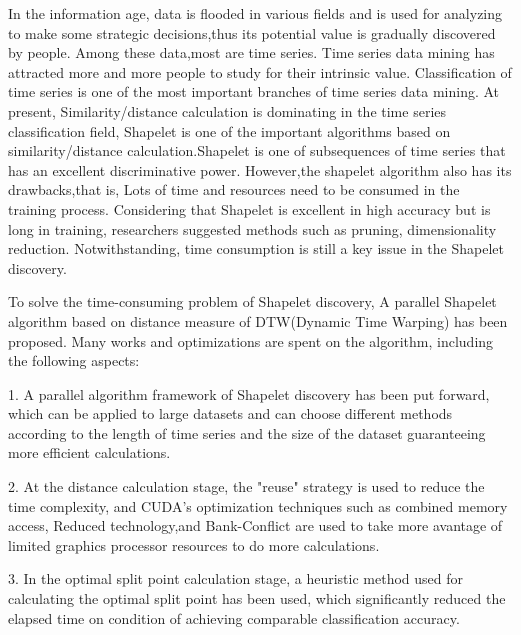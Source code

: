 \begin{eabstract}
	
In the information age, data is flooded in various fields and is used for analyzing to make some strategic decisions,thus its potential value is gradually discovered by people. Among these data,most are time series. Time series data mining has attracted more and more people to study for their intrinsic value. Classification of time series is one of the most important branches of time series data mining. At present, Similarity/distance calculation is dominating in the time series classification field, Shapelet is one of the important algorithms based on similarity/distance calculation.Shapelet is one of subsequences of time series that has an excellent discriminative power.
However,the shapelet algorithm also has its drawbacks,that is, Lots of time and resources need to be consumed in the training process. Considering that Shapelet is excellent in high accuracy but is long in training, researchers suggested methods such as pruning, dimensionality reduction. Notwithstanding, time consumption is still a key issue in the Shapelet discovery.

To solve the time-consuming problem of Shapelet discovery, A parallel Shapelet algorithm based on distance measure of DTW(Dynamic Time Warping) has been proposed. Many works and optimizations are spent on the algorithm, including the following aspects:

1. A parallel algorithm framework of Shapelet discovery has been put forward, which can be applied to large datasets and can choose different methods according to the length of time series and the size of the dataset guaranteeing more efficient calculations.

2. At the distance calculation stage, the "reuse" strategy is used to reduce the time complexity, and CUDA's optimization techniques such as combined memory access, Reduced technology,and Bank-Conflict are used to take more avantage of limited graphics processor resources to do more calculations.

3. In the optimal split point calculation stage, a heuristic method used for calculating the optimal split point has been used, which significantly reduced the elapsed time on condition of achieving comparable classification accuracy.



\end{eabstract}
